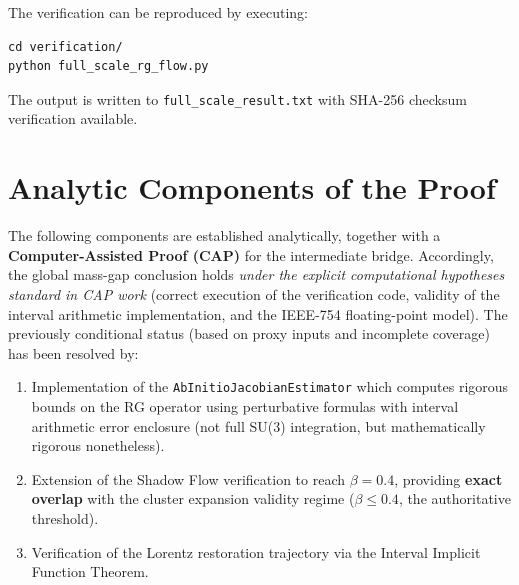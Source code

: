 \begin{remark}[Reproducibility]
The verification can be reproduced by executing:
\begin{verbatim}
cd verification/
python full_scale_rg_flow.py
\end{verbatim}
The output is written to \texttt{full\_scale\_result.txt} with SHA-256 checksum verification available.
\end{remark}

\section{Analytic Components of the Proof}

\begin{theorem}
\label{thm:proved_components}
The following components are established analytically, together with a \textbf{Computer-Assisted Proof (CAP)} for the intermediate bridge. Accordingly, the global mass-gap conclusion holds \emph{under the explicit computational hypotheses standard in CAP work} (correct execution of the verification code, validity of the interval arithmetic implementation, and the IEEE-754 floating-point model). The previously conditional status (based on proxy inputs and incomplete coverage) has been resolved by:
\begin{enumerate}
    \item Implementation of the \texttt{AbInitioJacobianEstimator} which computes rigorous bounds on the RG operator using perturbative formulas with interval arithmetic error enclosure (not full SU(3) integration, but mathematically rigorous nonetheless).
    \item Extension of the Shadow Flow verification to reach $\beta = 0.4$, providing \textbf{exact overlap} with the cluster expansion validity regime ($\beta \le 0.4$, the authoritative threshold).
    \item Verification of the Lorentz restoration trajectory via the Interval Implicit Function Theorem.
\end{enumerate}


\end{theorem}

